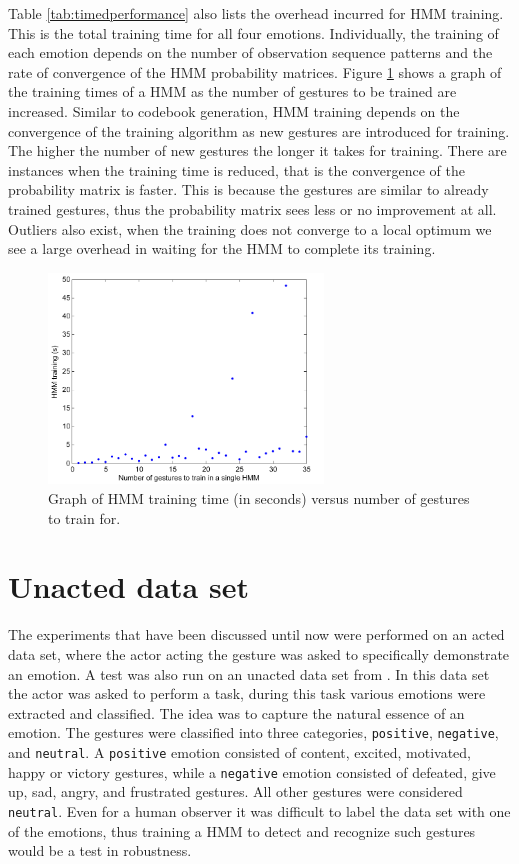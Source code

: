 \documentclass[]{report}   %
\begin{document}
Table \ref{tab:timedperformance} also lists the overhead incurred for HMM training. This is the total training time for all four emotions. Individually, the training of each emotion depends on the number of observation sequence patterns and the rate of convergence of the HMM probability matrices. Figure \ref{fig:trainoverhead} shows a graph of the training times of a HMM as the number of gestures to be trained are increased. Similar to codebook generation, HMM training depends on the convergence of the training algorithm as new gestures are introduced for training. The higher the number of new gestures the longer it takes for training. There are instances when the training time is reduced, that is the convergence of the probability matrix is faster. This is because the gestures are similar to already trained gestures, thus the probability matrix sees less or no improvement at all. Outliers also exist, when the training does not converge to a local optimum we see a large overhead in waiting for the HMM to complete its training.
\begin{figure}[htbp]
	\centering
		\includegraphics[width=0.65\textwidth]{trainoverhead.pdf}
	\caption{Graph of HMM training time (in seconds) versus number of gestures to train for.}
	\label{fig:trainoverhead}
\end{figure}

\section{Unacted data set}
The experiments that have been discussed until now were performed on an acted data set, where the actor acting the gesture was asked to specifically demonstrate an emotion. A test was also run on an unacted data set from \citet{KlEINSMITH_Bianchi-Berthouze_Steed_2011}. In this data set the actor was asked to perform a task, during this task various emotions were extracted and classified. The idea was to capture the natural essence of an emotion. The gestures were classified into three categories, \texttt{positive}, \texttt{negative}, and \texttt{neutral}. A \texttt{positive} emotion consisted of content, excited, motivated, happy or victory gestures, while a \texttt{negative} emotion consisted of defeated, give up, sad, angry, and frustrated gestures. All other gestures were considered \texttt{neutral}. Even for a human observer it was difficult to label the data set with one of the emotions, thus training a HMM to detect and recognize such gestures would be a test in robustness.
\end{document}

